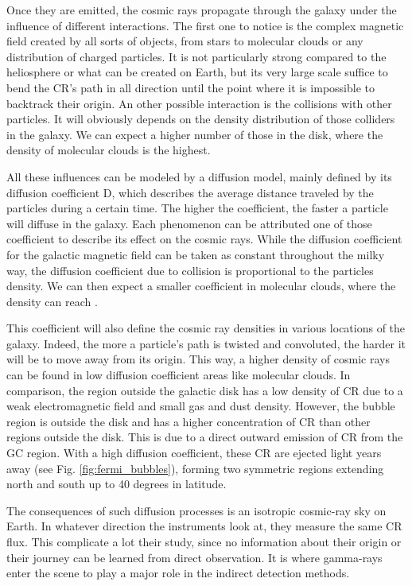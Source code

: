 Once they are emitted, the cosmic rays propagate through the galaxy under the influence of different interactions.
The first one to notice is the complex magnetic field created by all sorts of objects, from stars to molecular clouds or any distribution of charged particles. It is not particularly strong  compared to the heliosphere or what can be created on Earth, but its very large scale suffice to bend the CR's path in all direction until the point where it is impossible to backtrack their origin.
An other possible interaction is the collisions with other particles. It will obviously depends on the density distribution of those colliders in the galaxy. We can expect a higher number of those in the disk, where the density of molecular clouds is the highest.

All these influences can be modeled by a diffusion model, mainly defined by its diffusion coefficient D, which describes the average distance traveled by the particles during a certain time. The higher the coefficient, the faster a particle will diffuse in the galaxy. Each phenomenon can be attributed one of those coefficient to describe its effect on the cosmic rays. 
While the diffusion coefficient for the galactic magnetic field can be taken as constant throughout the milky way, the diffusion coefficient due to collision is proportional to the particles density. We can then expect a smaller coefficient in molecular clouds, where the density can reach .

This coefficient will also define the cosmic ray densities in various locations of the galaxy. Indeed, the more a particle's path is twisted and convoluted, the harder it will be to move away from its origin. This way, a higher density of cosmic rays can be found in low diffusion coefficient areas like molecular clouds. In comparison, the region outside the galactic disk has a low density of CR due to a weak electromagnetic field and small gas and dust density. However, the bubble region is outside the disk and has a higher concentration of CR than other regions outside the disk. This is due to a direct outward emission of CR from the GC region. With a high diffusion coefficient, these CR are ejected light years away (see Fig. \ref{fig:fermi_bubbles}), forming two symmetric regions extending north and south up to 40 degrees in latitude.

The consequences of such diffusion processes is an isotropic cosmic-ray sky on Earth. In whatever direction the instruments look at, they measure the same CR flux. This complicate a lot their study, since no information about their origin or their journey can be learned from direct observation. It is where gamma-rays enter the scene to play a major role in the indirect detection methods.

